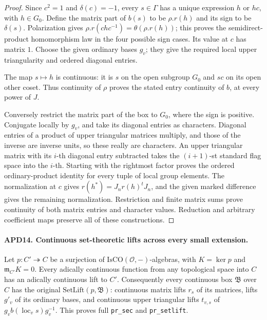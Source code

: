 \begin{proof}
Since \(c^2=1\) and \(\delta(c)=-1\), every \(s\in\Gamma\)
has a unique expression \(h\) or \(hc\), with \(h\in G_0\).
Define the matrix part of \(b(s)\) to be \(\rho.r(h)\) and
its sign to be \(\delta(s)\).  Polarization gives
\(\rho.r(chc^{-1})=\theta(\rho.r(h))\); this proves the
semidirect-product homomorphism law in the four possible sign
cases.  Its value at \(c\) has matrix \(1\).  Choose the
given ordinary bases \(g_v\); they give the required local
upper triangularity and ordered diagonal entries.

The map \(s\mapsto h\) is continuous: it is \(s\) on the
open subgroup \(G_0\) and \(sc\) on its open other coset.
Thus continuity of \(\rho\) proves the stated entry continuity
of \(b\), at every power of \(J\).

Conversely restrict the matrix part of the box to \(G_0\),
where the sign is positive.  Conjugate locally by \(g_v\),
and take its diagonal entries as characters.  Diagonal entries
of a product of upper triangular matrices multiply, and those
of the inverse are inverse units, so these really are characters.
An upper triangular matrix with its \(i\)-th diagonal entry
subtracted takes the \((i+1)\)-st standard flag space into the
\(i\)-th.  Starting with the rightmost factor proves the
ordered ordinary-product identity for every tuple of local
group elements.  The normalization at \(c\) gives
\(r(h^*)=J_nr(h)^tJ_n\), and the given marked difference
gives the remaining normalization.  Restriction and finite matrix
sums prove continuity of both matrix entries and character values.
Reduction and arbitrary coefficient maps preserve all of these
constructions.
\end{proof}

\paragraph{APD14. Continuous set-theoretic lifts across every small extension.}
\label{claim:APD14}
Let \(p:C'\twoheadrightarrow C\) be a surjection of
\(\mathrm{IsCO}(\mathcal O,-)\)-algebras, with
\(K=\ker p\) and \(\mathfrak m_{C'}K=0\).  Every
adically continuous function from any topological space into
\(C\) has an adically continuous lift to \(C'\).
Consequently every continuous box \(\mathfrak B\) over \(C\)
has the original \(\mathrm{SetLift}(p,\mathfrak B)\): continuous
matrix lifts \(r_s\) of its matrices, lifts \(g'_v\) of its
ordinary bases, and continuous upper triangular lifts \(t_{v,s}\)
of \(g_vb(\operatorname{loc}_v s)g_v^{-1}\).
This proves full \texttt{pr\_sec} and \texttt{pr\_setlift}.

